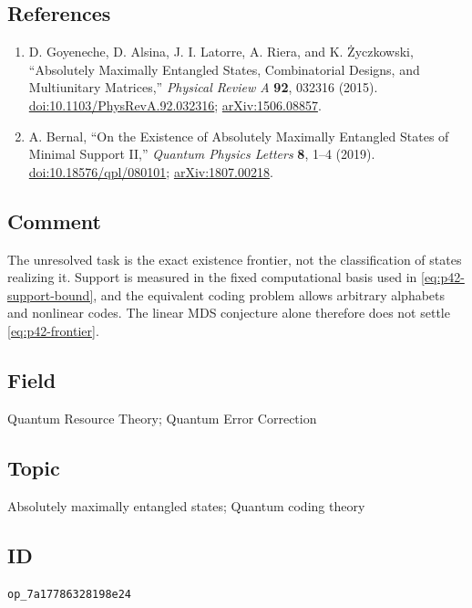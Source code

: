 \subsection*{References}

\begin{enumerate}[label={},leftmargin=4.8em,labelsep=0.5em]
  \footnotesize
  \item[\textup{[GAL+15]}]\label{ref:p42-goyeneche}
  D. Goyeneche, D. Alsina, J. I. Latorre, A. Riera, and K. \.{Z}yczkowski,
  ``Absolutely Maximally Entangled States, Combinatorial Designs, and
  Multiunitary Matrices,'' \emph{Physical Review A} \textbf{92}, 032316
  (2015).
  \href{https://doi.org/10.1103/PhysRevA.92.032316}{doi:10.1103/PhysRevA.92.032316};
  \href{https://arxiv.org/abs/1506.08857}{arXiv:1506.08857}.

  \item[\textup{[Ber19]}]\label{ref:p42-bernal}
  A. Bernal, ``On the Existence of Absolutely Maximally Entangled States of
  Minimal Support II,'' \emph{Quantum Physics Letters} \textbf{8}, 1--4
  (2019).
  \href{https://doi.org/10.18576/qpl/080101}{doi:10.18576/qpl/080101};
  \href{https://arxiv.org/abs/1807.00218}{arXiv:1807.00218}.
\end{enumerate}

\subsection*{Comment}

The unresolved task is the exact existence frontier, not the classification
of states realizing it.  Support is measured in the fixed computational
basis used in \eqref{eq:p42-support-bound}, and the equivalent coding problem
allows arbitrary alphabets and nonlinear codes.  The linear MDS conjecture
alone therefore does not settle \eqref{eq:p42-frontier}.

\subsection*{Field}

Quantum Resource Theory; Quantum Error Correction

\subsection*{Topic}

Absolutely maximally entangled states; Quantum coding theory

\subsection*{ID}

\texttt{op\_7a17786328198e24}
